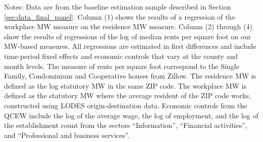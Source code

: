 \begin{table}[hbt!]
    \begin{minipage}{.95\textwidth} \footnotesize
        \vspace{2mm}
        Notes:
        Data are from the baseline estimation sample described in Section 
        \ref{sec:data_final_panel}.
        Column (1) shows the results of a regression of the workplace MW measure
        on the residence MW measure.
        Column (2) through (4) show the results of regressions of the log of 
        median rents per square foot on our MW-based measures.
        All regressions are estimated in first differences and include 
        time-period fixed effects and economic controls that vary at the 
        county and month levels.
        The measure of rents per square foot correspond to the Single Family, 
        Condominium and Cooperative houses from Zillow.
        The residence MW is defined as the log statutory MW in the same ZIP code.
        The workplace MW is defined as the statutory MW where the average 
        resident of the ZIP code works, constructed using LODES 
        origin-destination data.
        Economic controls from the QCEW include the log of the average wage, 
        the log of employment, and the log of the establishment count from the 
        sectors ``Information'', ``Financial activities'', and ``Professional
        and business services''.
    \end{minipage}
\end{table}
